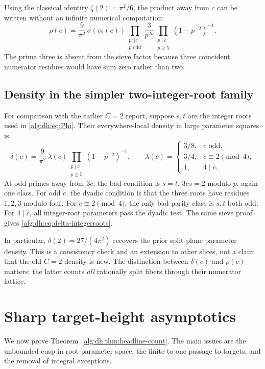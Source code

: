 \documentclass[11pt]{article}
\numberwithin{equation}{section}
\theoremstyle{plain}
\theoremstyle{plain}
\theoremstyle{plain}
\theoremstyle{definition}
\theoremstyle{definition}
\theoremstyle{definition}
\theoremstyle{remark}
\begin{document}
Using the classical identity $\zeta(2)=\pi^2/6$, the product away from
$c$ can be written without an infinite numerical computation:
\begin{equation}\label{alg:dh:eq:rho-finite}
 \rho(c)=\frac9{\pi^2}\,\sigma(v_2(c))
 \prod_{\substack{p^\nu\Vert c\\p\text{ odd}}}\frac3{p^{2\nu}}
 \prod_{\substack{p\mid c\\p\ge5}}(1-p^{-2})^{-1}.
\end{equation}
The prime three is absent from the sieve factor because three coincident
numerator residues would have sum zero rather than two.

\subsection{Density in the simpler two-integer-root family}
For comparison with the earlier $C=2$ report, suppose $s,t$ are the
integer roots used in \eqref{alg:dh:eq:Phi}. Their everywhere-local density in
large parameter squares is
\begin{equation}\label{alg:dh:eq:delta-integerroots}
 \delta(c)=\frac9{\pi^2}\,\lambda(c)
 \prod_{\substack{p\mid c\\p\ge5}}(1-p^{-2})^{-1},
\qquad
 \lambda(c)=\begin{cases}
 3/8,&c\text{ odd},\\
 3/4,&c\equiv2\pmod4,\\
 1,&4\mid c.
 \end{cases}
\end{equation}
At odd primes away from $3c$, the bad condition is
$s=t$, $3cs=2$ modulo $p$, again one class. For odd $c$, the dyadic
condition is that the three roots have residues $1,2,3$ modulo four.
For $c\equiv2\pmod4$, the only bad parity class is $s,t$ both odd.
For $4\mid c$, all integer-root parameters pass the dyadic test.
The same sieve proof gives \eqref{alg:dh:eq:delta-integerroots}.

In particular, $\delta(2)=27/(4\pi^2)$ recovers the prior split-plane
parameter density. This is a consistency check and an extension to other
slices, not a claim that the old $C=2$ density is new. The distinction
between $\delta(c)$ and $\rho(c)$ matters: the latter counts \emph{all}
rationally split fibers through their numerator lattice.

\section{Sharp target-height asymptotics}\label{alg:dh:sec:count}
We now prove Theorem~\ref{alg:dh:thm:headline-count}. The main issues are the
unbounded cusp in root-parameter space, the finite-to-one passage to
targets, and the removal of integral exceptions.
\end{document}
